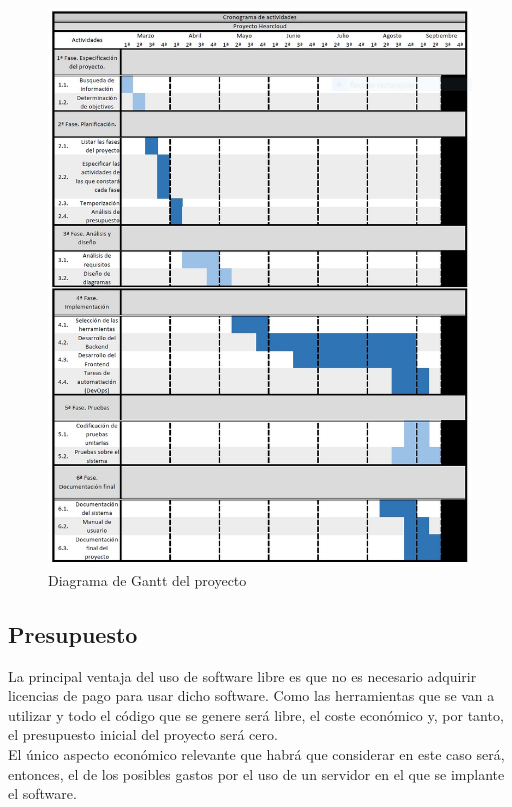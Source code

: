 \begin{figure}[H] 
\centering 
\includegraphics[scale=0.8]{../images/d_gantt.jpg}
\caption{Diagrama de Gantt del proyecto}
\end{figure}

\subsection{Presupuesto}

La principal ventaja del uso de software libre es que no es necesario adquirir licencias de pago para usar dicho software. Como las herramientas que se van a utilizar y todo el código que se genere será libre, el coste económico y, por tanto, el presupuesto inicial del proyecto será cero.\\

El único aspecto económico relevante que habrá que considerar en este caso será, entonces, el de los posibles gastos por el uso de un servidor en el que se implante el software.

